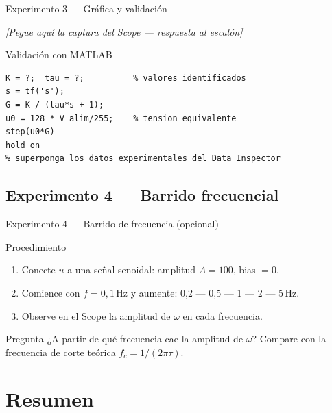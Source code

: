 \documentclass{beamer}
\begin{document}
\begin{frame}[fragile]{Experimento 3 --- Gráfica y validación}
\begin{center}
  \textit{[Pegue aquí la captura del Scope --- respuesta al escalón]}
\end{center}
\vspace{4pt}
\begin{block}{Validación con MATLAB}
  \begin{lstlisting}
K = ?;  tau = ?;          % valores identificados
s = tf('s');
G = K / (tau*s + 1);
u0 = 128 * V_alim/255;    % tension equivalente
step(u0*G)
hold on
% superponga los datos experimentales del Data Inspector
\end{lstlisting}
\end{block}
\end{frame}

\subsection{Experimento 4 --- Barrido frecuencial}

\begin{frame}{Experimento 4 --- Barrido de frecuencia (opcional)}
\begin{block}{Procedimiento}
  \begin{enumerate}
    \item Conecte $u$ a una señal senoidal: amplitud $A = 100$, bias $= 0$.
    \item Comience con $f = 0{,}1$\,Hz y aumente: 0,2 --- 0,5 --- 1 --- 2 --- 5\,Hz.
    \item Observe en el Scope la amplitud de $\omega$ en cada frecuencia.
  \end{enumerate}
\end{block}
\begin{block}{Pregunta}
  ¿A partir de qué frecuencia cae la amplitud de $\omega$?
  Compare con la frecuencia de corte teórica
  $f_c = 1/(2\pi\tau)$.
\end{block}
\end{frame}

\section{Resumen}
\end{document}
